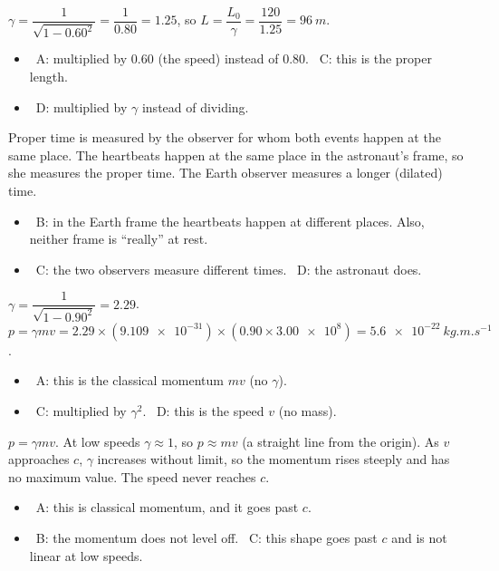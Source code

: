 \documentclass[12pt]{article}
\begin{document}
\begin{practiceanswers}
\begin{practiceans}
  $\gamma = \dfrac{1}{\sqrt{1 - 0.60^2}} = \dfrac{1}{0.80} = 1.25$, so
  $L = \dfrac{L_0}{\gamma} = \dfrac{120}{1.25} = \qty{96}{m}$.
  \begin{itemize}
    \item \xmark\ A: multiplied by $0.60$ (the speed) instead of $0.80$. \quad \xmark\ C: this is the
          proper length.
    \item \xmark\ D: multiplied by $\gamma$ instead of dividing.
  \end{itemize}
\end{practiceans}

\begin{practiceans}
  Proper time is measured by the observer for whom both events happen at the same place. The heartbeats
  happen at the same place in the astronaut's frame, so she measures the proper time. The Earth observer
  measures a longer (dilated) time.
  \begin{itemize}
    \item \xmark\ B: in the Earth frame the heartbeats happen at different places. Also, neither frame is
          ``really'' at rest.
    \item \xmark\ C: the two observers measure different times. \quad \xmark\ D: the astronaut does.
  \end{itemize}
\end{practiceans}

\begin{practiceans}
  $\gamma = \dfrac{1}{\sqrt{1 - 0.90^2}} = 2.29$. \quad
  $p = \gamma m v = 2.29 \times (\num{9.109e-31}) \times (0.90 \times \num{3.00e8}) = \qty{5.6e-22}{kg.m.s^{-1}}$.
  \begin{itemize}
    \item \xmark\ A: this is the classical momentum $mv$ (no $\gamma$).
    \item \xmark\ C: multiplied by $\gamma^2$. \quad \xmark\ D: this is the speed $v$ (no mass).
  \end{itemize}
\end{practiceans}

\begin{practiceans}
  $p = \gamma m v$. At low speeds $\gamma \approx 1$, so $p \approx mv$ (a straight line from the origin).
  As $v$ approaches $c$, $\gamma$ increases without limit, so the momentum rises steeply and has no
  maximum value. The speed never reaches $c$.
  \begin{itemize}
    \item \xmark\ A: this is classical momentum, and it goes past $c$.
    \item \xmark\ B: the momentum does not level off. \quad \xmark\ C: this shape goes past $c$ and
          is not linear at low speeds.
  \end{itemize}
\end{practiceans}


\end{practiceanswers}
\end{document}
